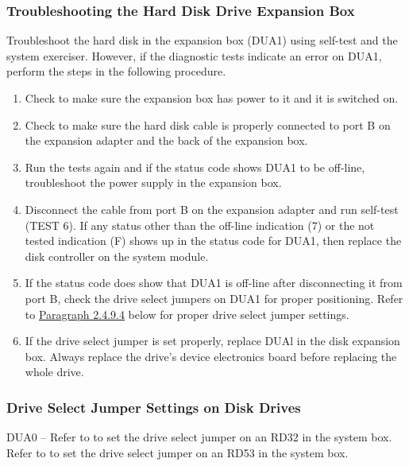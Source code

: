\subsubsection{Troubleshooting the Hard Disk Drive Expansion Box}

Troubleshoot the hard disk in the expansion box (DUA1) using self-test and
the system exerciser. However, if the diagnostic tests indicate an error on
DUA1, perform the steps in the following procedure.

\begin{enumerate}
\item	Check to make sure the expansion box has power to it and it is switched on.

\item	Check to make sure the hard disk cable is properly connected to port
		B on the expansion adapter and the back of the expansion box.

\item	Run the tests again and if the status code shows DUA1 to be off-line,
		troubleshoot the power supply in the expansion box.

\item	Disconnect the cable from port B on the expansion adapter and run
		self-test (TEST 6). If any status other than the off-line indication (7) or
		the not tested indication (F) shows up in the status code for DUA1, then
		replace the disk controller on the system module.

\item	If the status code does show that DUA1 is off-line after disconnecting
		it from port B, check the drive select jumpers on DUA1 for proper
		positioning. Refer to \hyperlink{subsubsection.2.4.9.4}{Paragraph 2.4.9.4} 
		below for proper drive select jumper settings.

\item	If the drive select jumper is set properly, replace DUAl in the disk
		expansion box. Always replace the drive's device electronics board
		before replacing the whole drive.
\end{enumerate}

\subsubsection{Drive Select Jumper Settings on Disk Drives}

DUA0 -- Refer to  to set the drive select jumper on an RD32 in
the system box. Refer to  to set the drive select jumper on an
RD53 in the system box.

